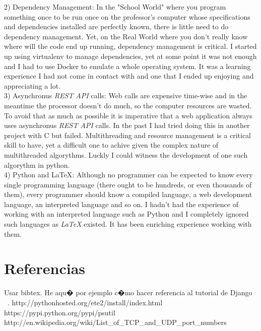 \documentclass[10pt]{article}
\begin{document}
2) Dependency Management: In the "School World" where you program something once to be run once on the professor's computer whose specifications and dependencies installed are perfectly known, there is little need to do dependency management. Yet, on the Real World where you don't really know where will the code end up running, dependency management is critical. I started up using virtualenv to manage dependencies, yet at some point it was not enough and I had to use Docker to emulate a whole operating system. It was a learning experience I had not come in contact with and one that I ended up enjoying and appreciating a lot.\\

3) Asynchronus \textit{REST API} calls: Web calls are expensive time-wise and in the meantime the processor doesn't do much, so the computer resources are wasted. To avoid that as much as possible it is imperative that a web application always uses asynchronus \textit{REST API} calls. In the past I had tried doing this in another project with C but failed. Multithreading and resource management is a critical skill to have, yet a difficult one to achive given the complex nature of multithreaded algorythms. Luckly I could witness the development of one such algorythm in python.\\

4) Python and \LaTeX: Although no programmer can be expected to know every single programming language (there ought to be hundreds, or even thousands of them), every programmer should know a compiled language, a web development language, an interpreted language and so on. I hadn't had the experience of working with an interpreted language such as Python and I completely ignored such languages as \textit{LaTeX} existed. It has been enriching experience working with them.\\

\section{Referencias}
 Usar bibtex. He aqu� por ejemplo c�mo hacer referencia al tutorial de Django ~\cite{DjangoTut}.
http://pythonhosted.org/ete2/install/index.html
https://pypi.python.org/pypi/psutil
http://en.wikipedia.org/wiki/List\_of\_TCP\_and\_UDP\_port\_numbers
{}

\end{document}
